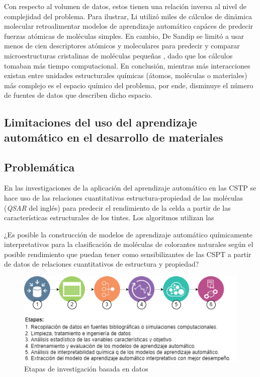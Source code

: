 Con respecto al volumen de datos, estos tienen una relación inversa al nivel de complejidad del problema. Para ilustrar, Li utilizó miles de cálculos de dinámica molecular retroalimentar modelos de aprendizaje automático capáces de predecir fuerzas atómicas \cite{li2015molecular} de moléculas simples. En cambio, De Sandip se limitó a usar menos de cien descriptores atómicos y moleculares para predecir y comparar microestructuras cristalinas de moléculas pequeñas \cite{de2016comparing}, dado que los cálculos tomaban más tiempo computacional. En conclusión, mientras más interacciones existan entre unidades estructurales químicas (átomos, moléculas o materiales) más complejo es el espacio químico del problema, por ende, disminuye el número de fuentes de datos que describen dicho espacio. 










\subsection{Limitaciones del uso del aprendizaje automático en el desarrollo de materiales}

\subsection{Problemática}


En las investigaciones de la aplicación del aprendizaje automático en las CSTP se hace uso de las relaciones cuantitativas estructura-propiedad de las moléculas (\textit{QSAR} del inglés) para predecir el rendimiento de la celda a partir de las características estructurales de los tintes. Los algoritmos utilizan las 

¿Es posible la construcción de modelos de aprendizaje automático químicamente interpretativos para la clasificación de moléculas de colorantes naturales según el posible rendimiento que puedan tener como sensibilizantes de las CSPT a partir de datos de relaciones cuantitativos de estructura y propiedad?


\begin{figure}[h!]
    \begin{center}
        \includegraphics[scale=0.7]{img/etapas.png}
    \end{center}
    \label{img:etapas}
    \caption{Etapas de investigación basada en datos}
\end{figure}
